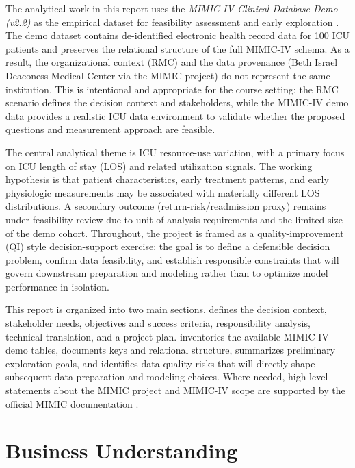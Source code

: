 \documentclass[12pt]{article}
\begin{document}
The analytical work in this report uses the \textit{MIMIC-IV Clinical Database Demo (v2.2)} as the empirical dataset for feasibility assessment and early exploration \cite{PhysioNet-mimic-iv-demo-2.2,Goldberger2000PhysioNet}. The demo dataset contains de-identified electronic health record data for 100 ICU patients and preserves the relational structure of the full MIMIC-IV schema. As a result, the organizational context (RMC) and the data provenance (Beth Israel Deaconess Medical Center via the MIMIC project) do not represent the same institution. This is intentional and appropriate for the course setting: the RMC scenario defines the decision context and stakeholders, while the MIMIC-IV demo data provides a realistic ICU data environment to validate whether the proposed questions and measurement approach are feasible.

The central analytical theme is ICU resource-use variation, with a primary focus on ICU length of stay (LOS) and related utilization signals. The working hypothesis is that patient characteristics, early treatment patterns, and early physiologic measurements may be associated with materially different LOS distributions. A secondary outcome (return-risk/readmission proxy) remains under feasibility review due to unit-of-analysis requirements and the limited size of the demo cohort. Throughout, the project is framed as a quality-improvement (QI) style decision-support exercise: the goal is to define a defensible decision problem, confirm data feasibility, and establish responsible constraints that will govern downstream preparation and modeling rather than to optimize model performance in isolation.

This report is organized into two main sections.  defines the decision context, stakeholder needs, objectives and success criteria, responsibility analysis, technical translation, and a project plan.  inventories the available MIMIC-IV demo tables, documents keys and relational structure, summarizes preliminary exploration goals, and identifies data-quality risks that will directly shape subsequent data preparation and modeling choices. Where needed, high-level statements about the MIMIC project and MIMIC-IV scope are supported by the official MIMIC documentation \cite{MIMICAbout}.


\newpage

\section{Business Understanding}
\label{sec:business}
\end{document}

